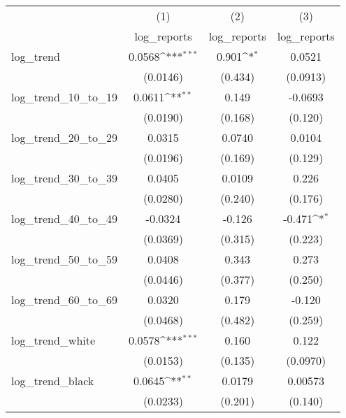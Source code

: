 {
\def\sym#1{\ifmmode^{#1}\else\(^{#1}\)\fi}
\begin{tabular}{l*{3}{c}}
\hline\hline
            &\multicolumn{1}{c}{(1)}&\multicolumn{1}{c}{(2)}&\multicolumn{1}{c}{(3)}\\
            &\multicolumn{1}{c}{log\_reports}&\multicolumn{1}{c}{log\_reports}&\multicolumn{1}{c}{log\_reports}\\
\hline
log\_trend   &      0.0568\sym{***}&       0.901\sym{*}  &      0.0521         \\
            &    (0.0146)         &     (0.434)         &    (0.0913)         \\
\hline
log\_trend\_10\_to\_19&      0.0611\sym{**} &       0.149         &     -0.0693         \\
            &    (0.0190)         &     (0.168)         &     (0.120)         \\
\hline
log\_trend\_20\_to\_29&      0.0315         &      0.0740         &      0.0104         \\
            &    (0.0196)         &     (0.169)         &     (0.129)         \\
\hline
log\_trend\_30\_to\_39&      0.0405         &      0.0109         &       0.226         \\
            &    (0.0280)         &     (0.240)         &     (0.176)         \\
\hline
log\_trend\_40\_to\_49&     -0.0324         &      -0.126         &      -0.471\sym{*}  \\
            &    (0.0369)         &     (0.315)         &     (0.223)         \\
\hline
log\_trend\_50\_to\_59&      0.0408         &       0.343         &       0.273         \\
            &    (0.0446)         &     (0.377)         &     (0.250)         \\
\hline
log\_trend\_60\_to\_69&      0.0320         &       0.179         &      -0.120         \\
            &    (0.0468)         &     (0.482)         &     (0.259)         \\
\hline
log\_trend\_white&      0.0578\sym{***}&       0.160         &       0.122         \\
            &    (0.0153)         &     (0.135)         &    (0.0970)         \\
\hline
log\_trend\_black&      0.0645\sym{**} &      0.0179         &     0.00573         \\
            &    (0.0233)         &     (0.201)         &     (0.140)         \\

\end{tabular}}
